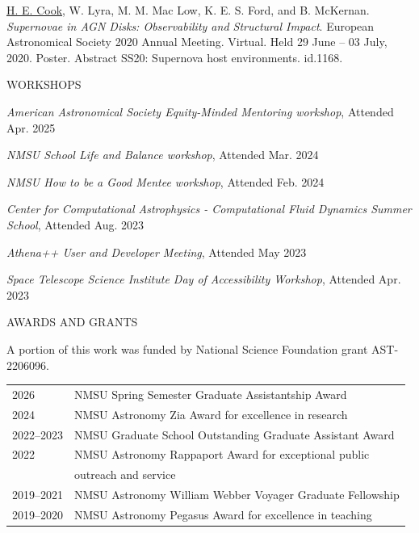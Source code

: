 \hangindent=0.5in \noindent \underline{H. E. Cook}, W. Lyra, M. M. Mac Low, K. E. S. Ford, and B. McKernan. \textit{Supernovae in AGN Disks: Observability and Structural Impact}. European Astronomical Society 2020 Annual Meeting. Virtual. Held 29 June -- 03 July, 2020. Poster. Abstract SS20: Supernova host environments. id.1168.



\begin{center}
WORKSHOPS
\end{center}

\hangindent=0.5in \noindent \textit{American Astronomical Society Equity-Minded Mentoring workshop}, Attended Apr. 2025

\hangindent=0.5in \noindent \textit{NMSU School Life and Balance workshop}, Attended Mar. 2024

\hangindent=0.5in \noindent \textit{NMSU How to be a Good Mentee workshop}, Attended Feb. 2024

\hangindent=0.5in \noindent \textit{Center for Computational Astrophysics - Computational Fluid Dynamics Summer School}, Attended Aug. 2023

\hangindent=0.5in \noindent \textit{Athena++ User and Developer Meeting}, Attended May 2023

\hangindent=0.5in \noindent \textit{Space Telescope Science Institute Day of Accessibility Workshop}, Attended Apr. 2023



\begin{center}
AWARDS AND GRANTS
\end{center}

\noindent A portion of this work was funded by National Science Foundation grant AST-2206096. 

\begin{flushleft}
\begin{tabular}{ll}
2026 & NMSU Spring Semester Graduate Assistantship Award \\
2024 & NMSU Astronomy Zia Award for excellence in research \\
2022--2023 & NMSU Graduate School Outstanding Graduate Assistant Award \\
2022 & NMSU Astronomy Rappaport Award for exceptional public \\
     & outreach and service \\ 
2019--2021 & NMSU Astronomy William Webber Voyager Graduate Fellowship \\
2019--2020 & NMSU Astronomy Pegasus Award for excellence in teaching \\
\end{tabular}
\end{flushleft}

